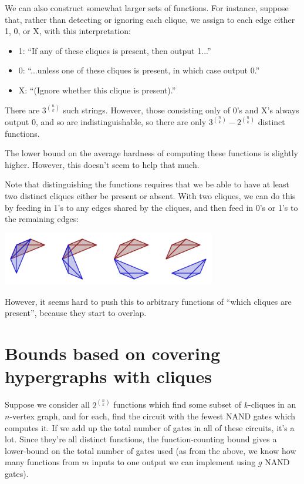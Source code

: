 \documentclass[12pt]{article}
\theoremstyle{definition}
\begin{document}
We can also construct somewhat larger sets of functions. For instance,
suppose that, rather than detecting or ignoring each clique, we assign
to each edge either 1, 0, or X, with this interpretation:

\begin{itemize}

\item 1: ``If any of these cliques is present, then output 1...''

\item 0: ``...unless one of these cliques is present, in which case output 0.''

\item X: ``(Ignore whether this clique is present).''

\end{itemize}

There are $3^{n \choose k}$ such strings. However, those consisting only of
0's and X's always output 0, and so are indistinguishable, so there are
only $3^{n \choose k} - 2^{n \choose k}$ distinct functions.

The lower bound on the average hardness of computing these functions is
slightly higher. However, this doesn't seem to help that much.

Note that distinguishing the functions requires that we be able to have at
least two distinct cliques either be present or absent. With two cliques,
we can do this by feeding in 1's to any edges shared by the cliques, and
then feed in 0's or 1's to the remaining edges:

\includegraphics[width=0.7\textwidth]{R/overlapping.pdf}

However, it seems hard to push this to arbitrary functions of ``which cliques are
present'', because they start to overlap.

\section{Bounds based on covering hypergraphs with cliques}

Suppose we consider all $2^{n \choose k}$ functions which find some subset
of $k$-cliques in an $n$-vertex graph, and for each, find the circuit with
the fewest NAND gates which computes it. If we add up the total number of
gates in all of these circuits,
it's a lot. Since they're all distinct functions, the
function-counting bound gives a lower-bound on
the total number of gates used (as from the
above, we know how many functions from $m$ inputs to one output
we can implement using $g$ NAND gates).
\end{document}
